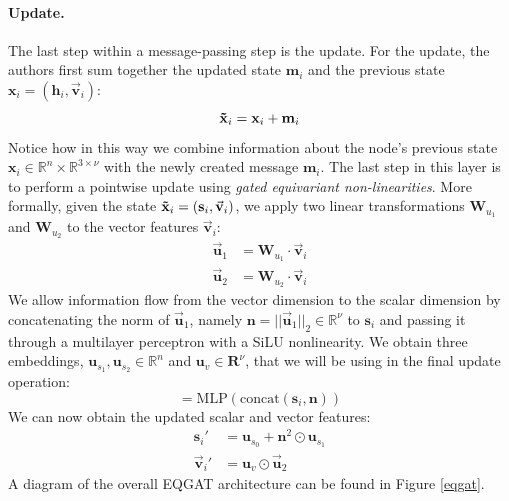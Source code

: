 \paragraph{Update.} The last step within a message-passing step is the update. For the update, the authors first sum together the updated state $\mathbf{m}_i$ and the previous state $\mathbf{x}_i = (\mathbf{h}_i, \vec{\mathbf{v}}_i)$:
\begin{equation}
    \mathbf{\Tilde{x}}_i = \mathbf{x}_i + \mathbf{m}_i
\end{equation}
Notice how in this way we combine information about the node's previous state $\mathbf{x}_i\in\mathbb{R}^n\times\mathbb{R}^{3\times\nu}$ with the newly created message $\mathbf{m}_i$. The last step in this layer is to perform a pointwise update using \textit{gated equivariant non-linearities}. More formally, given the state $\mathbf{\Tilde{x}}_i = (\mathbf{s}_i, \vec{\mathbf{v}}_i)$, we apply two linear transformations $\mathbf{W}_{u_1}$ and $\mathbf{W}_{u_2}$ to the vector features $\vec{\mathbf{v}}_i$:
\begin{align}
    \vec{\mathbf{u}}_1 &= \mathbf{W}_{u_1} \cdot \vec{\mathbf{v}}_i \\
    \vec{\mathbf{u}}_2 &= \mathbf{W}_{u_2} \cdot \vec{\mathbf{v}}_i 
\end{align}
We allow information flow from the vector dimension to the scalar dimension by concatenating the norm of $\vec{\mathbf{u}}_1$, namely $\mathbf{n} = ||\vec{\mathbf{u}}_1||_2 \in \mathbb{R}^{\nu}$ to $\mathbf{s}_i$ and passing it through a multilayer perceptron with a SiLU nonlinearity. We obtain three embeddings, $\mathbf{u}_{s_1}, \mathbf{u}_{s_2} \in \mathbb{R}^{n}$ and $\mathbf{u}_v \in \mathbf{R}^\nu$, that we will be using in the final update operation:
\begin{equation}
    [\mathbf{u}_{s_1}, \mathbf{u}_{s_2}, \mathbf{u}_v] = \text{MLP}(\text{concat}(\mathbf{s}_i, \mathbf{n}))
\end{equation}
We can now obtain the updated scalar and vector features:
\begin{align}
    \mathbf{s}_i' &= \mathbf{u}_{s_0} + \mathbf{n}^2 \odot \mathbf{u}_{s_1} \\
    \mathbf{\vec{v}}_i' &= \mathbf{u}_v \odot \vec{\mathbf{u}}_2
\end{align}
A diagram of the overall EQGAT architecture can be found in Figure \ref{eqgat}. 

